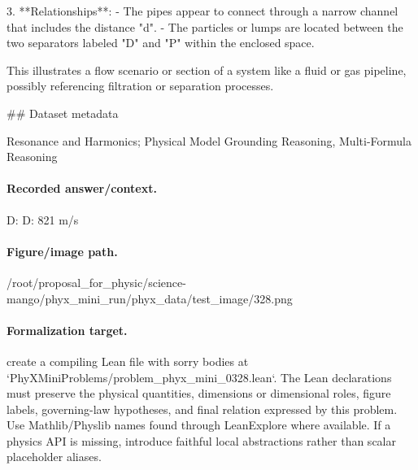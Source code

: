 3. **Relationships**:
   - The pipes appear to connect through a narrow channel that includes the distance "d".
   - The particles or lumps are located between the two separators labeled "D" and "P" within the enclosed space. 

This illustrates a flow scenario or section of a system like a fluid or gas pipeline, possibly referencing filtration or separation processes.

\#\# Dataset metadata

Resonance and Harmonics; Physical Model Grounding Reasoning, Multi-Formula Reasoning

\paragraph{Recorded answer/context.}
D: D: 821 m/s

\paragraph{Figure/image path.}
/root/proposal\_for\_physic/science-mango/phyx\_mini\_run/phyx\_data/test\_image/328.png

\paragraph{Formalization target.}
create a compiling Lean file with sorry bodies at `PhyXMiniProblems/problem\_phyx\_mini\_0328.lean`. The Lean declarations must preserve the physical quantities, dimensions or dimensional roles, figure labels, governing-law hypotheses, and final relation expressed by this problem.
Use Mathlib/Physlib names found through LeanExplore where available. If a physics API is missing, introduce faithful local abstractions rather than scalar placeholder aliases.


